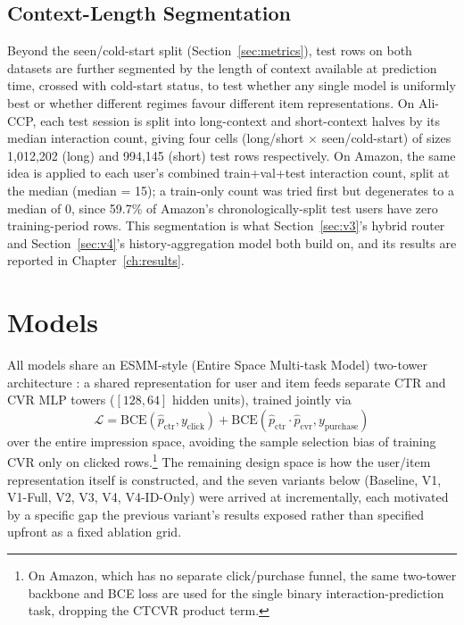 \subsection{Context-Length Segmentation}
\label{sec:context-segments}

Beyond the seen/cold-start split (Section~\ref{sec:metrics}), test rows on both datasets are further segmented by the length of context available at prediction time, crossed with cold-start status, to test whether any single model is uniformly best or whether different regimes favour different item representations. On Ali-CCP, each test session is split into long-context and short-context halves by its median interaction count, giving four cells (long/short $\times$ seen/cold-start) of sizes 1{,}012{,}202 (long) and 994{,}145 (short) test rows respectively. On Amazon, the same idea is applied to each user's combined train+val+test interaction count, split at the median (median = 15); a train-only count was tried first but degenerates to a median of 0, since 59.7\% of Amazon's chronologically-split test users have zero training-period rows. This segmentation is what Section~\ref{sec:v3}'s hybrid router and Section~\ref{sec:v4}'s history-aggregation model both build on, and its results are reported in Chapter~\ref{ch:results}.

\section{Models}
\label{sec:models}

All models share an ESMM-style (Entire Space Multi-task Model) two-tower architecture \cite{ma2018esmm}: a shared representation for user and item feeds separate CTR and CVR MLP towers ($[128, 64]$ hidden units), trained jointly via
\[
\mathcal{L} = \text{BCE}(\hat{p}_{\text{ctr}}, y_{\text{click}}) + \text{BCE}(\hat{p}_{\text{ctr}} \cdot \hat{p}_{\text{cvr}}, y_{\text{purchase}})
\]
over the entire impression space, avoiding the sample selection bias of training CVR only on clicked rows.\footnote{On Amazon, which has no separate click/purchase funnel, the same two-tower backbone and BCE loss are used for the single binary interaction-prediction task, dropping the CTCVR product term.} The remaining design space is how the user/item representation itself is constructed, and the seven variants below (Baseline, V1, V1-Full, V2, V3, V4, V4-ID-Only) were arrived at incrementally, each motivated by a specific gap the previous variant's results exposed rather than specified upfront as a fixed ablation grid.


